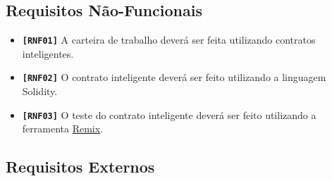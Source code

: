 \documentclass[a4paper,10pt]{article}
\begin{document}
\subsection{Requisitos Não-Funcionais}
\begin{itemize}
  \item \textbf{\texttt{[RNF01]}} A carteira de trabalho deverá ser feita utilizando contratos inteligentes.
  \item \textbf{\texttt{[RNF02]}} O contrato inteligente deverá ser feito utilizando a linguagem Solidity.
  \item \textbf{\texttt{[RNF03]}} O teste do contrato inteligente deverá ser feito utilizando a ferramenta \href{https://remix.ethereum.org/}{Remix}.
\end{itemize}

\subsection{Requisitos Externos}\label{sec:req_externos}
\end{document}
